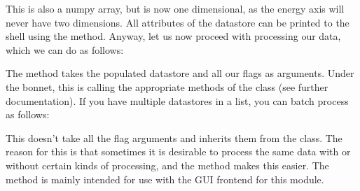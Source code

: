 \documentclass[a4paper,10pt,english]{sphinxmanual}
\begin{document}
\begin{sphinxVerbatim}[commandchars=\\\{\}]
\end{sphinxVerbatim}

\sphinxAtStartPar
This is also a numpy array, but is now one dimensional, as the energy axis will never have two dimensions. All attributes of the datastore can be printed to the shell using the  method. Anyway, let us now proceed with processing our data, which we can do as follows:

\begin{sphinxVerbatim}[commandchars=\\\{\}]
  
                       
                        
\end{sphinxVerbatim}

\sphinxAtStartPar
The  method takes the populated datastore and all our flags as arguments. Under the bonnet, this is calling the appropriate methods of the  class (see further documentation). If you have multiple datastores in a list, you can batch process as follows:

\begin{sphinxVerbatim}[commandchars=\\\{\}]
\end{sphinxVerbatim}

\sphinxAtStartPar
This doesn’t take all the flag arguments and inherits them from the class. The reason for this is that sometimes it is desirable to process the same data with or without certain kinds of processing, and the  method makes this easier. The  method is mainly intended for use with the GUI frontend for this module.
\end{document}
